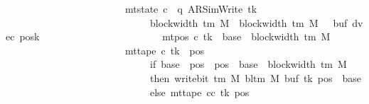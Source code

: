 \begin{isabellebody}
\ \ \ \ \ \ \ \ \ \ \ \ \ \ \ \ \ \ \ \ \ \ \ {\isasymand}\ mt{\isacharunderscore}{\kern0pt}state\ c{}\ {\isacharequal}{\kern0pt}\ {\isacharparenleft}{\kern0pt}q{\isacharcomma}{\kern0pt}\ AR{\isacharunderscore}{\kern0pt}SimWrite{\isacharcomma}{\kern0pt}\ tk{\isacharcomma}{\kern0pt}\isanewline
\ \ \ \ \ \ \ \ \ \ \ \ \ \ \ \ \ \ \ \ \ \ \ \ \ \ \ \ \ block{\isacharunderscore}{\kern0pt}width\ {\isacharparenleft}{\kern0pt}{\isasymGamma}{\isacharunderscore}{\kern0pt}tm\ M{\isacharparenright}{\kern0pt}\ {\isacharplus}{\kern0pt}\ {\isacharparenleft}{\kern0pt}block{\isacharunderscore}{\kern0pt}width\ {\isacharparenleft}{\kern0pt}{\isasymGamma}{\isacharunderscore}{\kern0pt}tm\ M{\isacharparenright}{\kern0pt}\ {\isacharminus}{\kern0pt}\ {}{\isacharparenright}{\kern0pt}{\isacharcomma}{\kern0pt}\ buf{\isacharcomma}{\kern0pt}\ dvec{\isacharcomma}{\kern0pt}\ posk{\isacharparenright}{\kern0pt}\isanewline
\ \ \ \ \ \ \ \ \ \ \ \ \ \ \ \ \ \ \ \ \ \ \ {\isasymand}\ mt{\isacharunderscore}{\kern0pt}pos\ c{}\ tk\ {\isacharequal}{\kern0pt}\ base\ {\isacharplus}{\kern0pt}\ {\isacharparenleft}{\kern0pt}block{\isacharunderscore}{\kern0pt}width\ {\isacharparenleft}{\kern0pt}{\isasymGamma}{\isacharunderscore}{\kern0pt}tm\ M{\isacharparenright}{\kern0pt}\ {\isacharminus}{\kern0pt}\ {}{\isacharparenright}{\kern0pt}\isanewline
\ \ \ \ \ \ \ \ \ \ \ \ \ \ \ \ \ \ \ \ \ \ \ {\isasymand}\ mt{\isacharunderscore}{\kern0pt}tape\ c{}\ tk\ {\isacharequal}{\kern0pt}\ {\isacharparenleft}{\kern0pt}{\isasymlambda}pos{\isachardot}{\kern0pt}\isanewline
\ \ \ \ \ \ \ \ \ \ \ \ \ \ \ \ \ \ \ \ \ \ \ \ \ \ \ \ \ if\ base\ {\isasymle}\ pos\ {\isasymand}\ pos\ {\isacharless}{\kern0pt}\ base\ {\isacharplus}{\kern0pt}\ {\isacharparenleft}{\kern0pt}block{\isacharunderscore}{\kern0pt}width\ {\isacharparenleft}{\kern0pt}{\isasymGamma}{\isacharunderscore}{\kern0pt}tm\ M{\isacharparenright}{\kern0pt}\ {\isacharminus}{\kern0pt}\ {}{\isacharparenright}{\kern0pt}\isanewline
\ \ \ \ \ \ \ \ \ \ \ \ \ \ \ \ \ \ \ \ \ \ \ \ \ \ \ \ \ then\ write{\isacharunderscore}{\kern0pt}bit\ {\isacharparenleft}{\kern0pt}{\isasymGamma}{\isacharunderscore}{\kern0pt}tm\ M{\isacharparenright}{\kern0pt}\ {\isacharparenleft}{\kern0pt}bl{\isacharunderscore}{\kern0pt}tm\ M{\isacharparenright}{\kern0pt}\ {\isacharparenleft}{\kern0pt}buf\ tk{\isacharparenright}{\kern0pt}\ {\isacharparenleft}{\kern0pt}pos\ {\isacharminus}{\kern0pt}\ base{\isacharparenright}{\kern0pt}\isanewline
\ \ \ \ \ \ \ \ \ \ \ \ \ \ \ \ \ \ \ \ \ \ \ \ \ \ \ \ \ else\ mt{\isacharunderscore}{\kern0pt}tape\ cc\ tk\ pos{\isacharparenright}{\kern0pt}\isanewline

\end{isabellebody}
